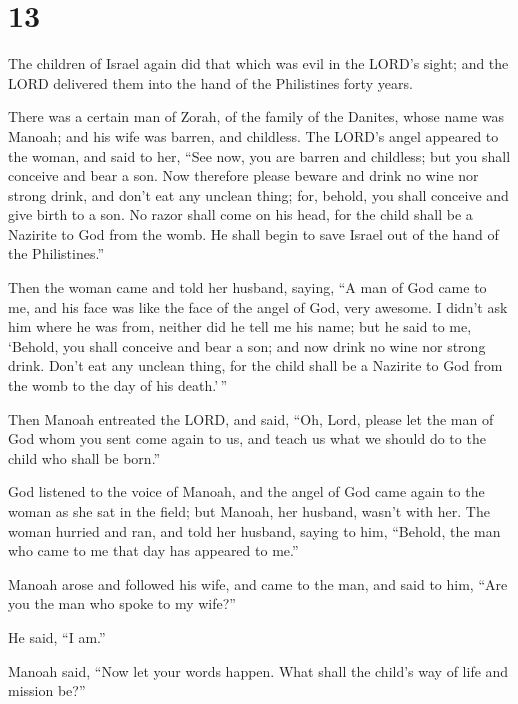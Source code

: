\hypertarget{section-12}{%
\section{13}\label{section-12}}

 The children of Israel again did that which was evil in
the LORD's sight; and the LORD delivered them into the hand of the
Philistines forty years.

 There was a certain man of Zorah, of the family of the
Danites, whose name was Manoah; and his wife was barren, and childless.
 The LORD's angel appeared to the woman, and said to her,
``See now, you are barren and childless; but you shall conceive and bear
a son.  Now therefore please beware and drink no wine nor
strong drink, and don't eat any unclean thing;  for,
behold, you shall conceive and give birth to a son. No razor shall come
on his head, for the child shall be a Nazirite to God from the womb. He
shall begin to save Israel out of the hand of the Philistines.''

 Then the woman came and told her husband, saying, ``A man
of God came to me, and his face was like the face of the angel of God,
very awesome. I didn't ask him where he was from, neither did he tell me
his name;  but he said to me, `Behold, you shall conceive
and bear a son; and now drink no wine nor strong drink. Don't eat any
unclean thing, for the child shall be a Nazirite to God from the womb to
the day of his death.'\,''

 Then Manoah entreated the LORD, and said, ``Oh, Lord,
please let the man of God whom you sent come again to us, and teach us
what we should do to the child who shall be born.''

 God listened to the voice of Manoah, and the angel of God
came again to the woman as she sat in the field; but Manoah, her
husband, wasn't with her.  The woman hurried and ran, and
told her husband, saying to him, ``Behold, the man who came to me that
day has appeared to me.''

 Manoah arose and followed his wife, and came to the man,
and said to him, ``Are you the man who spoke to my wife?''

He said, ``I am.''

 Manoah said, ``Now let your words happen. What shall the
child's way of life and mission be?''

